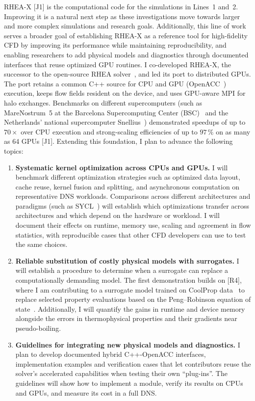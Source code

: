 \documentclass[11pt]{article}
\begin{document}
RHEA-X [J1] is the computational code for the simulations in Lines~1 and~2. 
Improving it is a natural next step as these investigations move towards larger and more complex simulations and research goals. 
Additionally, this line of work serves a broader goal of establishing RHEA-X as a reference tool for high-fidelity CFD by improving its performance while maintaining reproducibility, and enabling researchers to add physical models and diagnostics through documented interfaces that reuse optimized GPU routines.
I co-developed RHEA-X, the successor to the open-source RHEA solver~\cite{RHEASoftware}, and led its port to distributed GPUs. 
The port retains a common C++ source for CPU and GPU (OpenACC~\cite{OpenACC}) execution, keeps flow fields resident on the device, and uses GPU-aware MPI for halo exchanges. 
Benchmarks on different supercomputers (such as MareNostrum~5 at the Barcelona Supercomputing Center (BSC)~\cite{BSC} and the Netherlands' national supercomputer Snellius~\cite{Snellius}) demonstrated speedups of up to $70\times$ over CPU execution and strong-scaling efficiencies of up to $97\,\%$ on as many as 64 GPUs [J1]. 
Extending this foundation, I plan to advance the following topics:
\begin{enumerate}
	\item \textbf{Systematic kernel optimization across CPUs and GPUs.}
	I will benchmark different optimization strategies such as optimized data layout, cache reuse, kernel fusion and splitting, and asynchronous computation on representative DNS workloads. 
	Comparisons across different architectures and paradigms (such as SYCL~\cite{SYCL}) will establish which optimizations transfer across architectures and which depend on the hardware or workload. 
	I will document their effects on runtime, memory use, scaling and agreement in flow statistics, with reproducible cases that other CFD developers can use to test the same choices.
	
	\item \textbf{Reliable substitution of costly physical models with surrogates.}
	I will establish a procedure to determine when a surrogate can replace a computationally demanding model. 
	The first demonstration builds on [R4], where I am contributing to a surrogate model trained on CoolProp data~\cite{CoolProp2014} to replace selected property evaluations based on the Peng--Robinson equation of state~\cite{PengRobinson1976}. 
	Additionally, I will quantify the gains in runtime and device memory alongside the errors in thermophysical properties and their gradients near pseudo-boiling.
	
	\item \textbf{Guidelines for integrating new physical models and diagnostics.}
	I plan to develop documented hybrid C++-OpenACC interfaces, implementation examples and verification cases that let contributors reuse the solver's accelerated capabilities when testing their own ``plug-ins''. 
	The guidelines will show how to implement a module, verify its results on CPUs and GPUs, and measure its cost in a full DNS. 
\end{enumerate}
\end{document}
